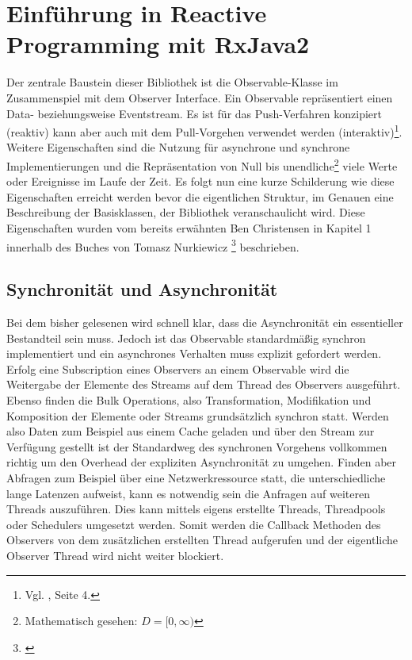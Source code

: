 \chapter{Einführung in Reactive Programming mit RxJava2}\label{rp_einfuehrung}
Der zentrale Baustein dieser Bibliothek ist die Observable-Klasse im Zusammenspiel mit dem Observer Interface. Ein Observable repräsentiert einen Data- beziehungsweise Eventstream. Es ist für das Push-Verfahren konzipiert (reaktiv) kann aber auch mit dem Pull-Vorgehen verwendet werden (interaktiv)\footnote{Vgl. \cite{Nurkiewicz.2017}, Seite 4.}. Weitere Eigenschaften sind die Nutzung für asynchrone und synchrone Implementierungen und die Repräsentation von Null bis unendliche\footnote{Mathematisch gesehen: $D = [0, \infty)$} viele Werte oder Ereignisse im Laufe der Zeit. Es folgt nun eine kurze Schilderung wie diese Eigenschaften erreicht werden bevor die eigentlichen Struktur, im Genauen eine Beschreibung der Basisklassen, der Bibliothek veranschaulicht wird. Diese Eigenschaften wurden vom bereits erwähnten Ben Christensen in Kapitel 1 innerhalb des Buches von Tomasz Nurkiewicz \footnote{\cite{Nurkiewicz.2017}} beschrieben.
\section{Synchronität und Asynchronität}
Bei dem bisher gelesenen wird schnell klar, dass die Asynchronität ein essentieller Bestandteil sein muss. Jedoch ist das Observable standardmäßig synchron implementiert und ein asynchrones Verhalten muss explizit gefordert werden. Erfolg eine Subscription eines Observers an einem Observable wird die Weitergabe der Elemente des Streams auf dem Thread des Observers ausgeführt. Ebenso finden die Bulk Operations, also Transformation, Modifikation und Komposition der Elemente oder Streams grundsätzlich synchron statt. Werden also Daten zum Beispiel aus einem Cache geladen und über den Stream zur Verfügung gestellt ist der Standardweg des synchronen Vorgehens vollkommen richtig um den Overhead der expliziten Asynchronität zu umgehen. Finden aber Abfragen zum Beispiel über eine Netzwerkressource statt, die unterschiedliche lange Latenzen aufweist, kann es notwendig sein die Anfragen auf weiteren Threads auszuführen. Dies kann mittels eigens erstellte Threads, Threadpools oder Schedulers umgesetzt werden. Somit werden die Callback Methoden des Observers von dem zusätzlichen erstellten Thread aufgerufen und der eigentliche Observer Thread wird nicht weiter blockiert.
